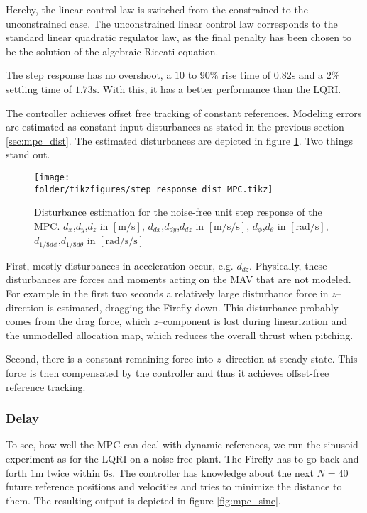 Hereby, the linear control law is switched from the constrained to the unconstrained case. The unconstrained linear control law corresponds to the standard linear quadratic regulator law, as the final penalty has been chosen to be the solution of the algebraic Riccati equation.

The step response has no overshoot, a $10$ to $90\si{\percent}$ rise time of $0.82 \si{\second}$ and a $2\si{\percent}$ settling time of $1.73 \si{\second}$. With this, it has a better performance than the LQRI.

The controller achieves offset free tracking of constant references. Modeling errors are estimated as constant input disturbances as stated in the previous section \ref{sec:mpc_dist}. The estimated disturbances are depicted in figure \ref{fig:mpc_step_dist}. Two things stand out.

\begin{figure}
\centering
\texttt{[image: \\folder/tikzfigures/step\_response\_dist\_MPC.tikz]}
\caption{Disturbance estimation for the noise-free unit step response of the MPC. $d_x$,$d_y$,$d_z$ in $[\si{\metre\per\second}]$, $d_{dx}$,$d_{dy}$,$d_{dz}$ in $[\si{\metre\per\second\per\second}]$, $d_\phi$,$d_\theta$ in $[\si{\radian\per\second}]$, $d_{1/8d\phi}$,$d_{1/8d\theta}$ in $[\si{\radian\per\second\per\second}]$}
\label{fig:mpc_step_dist}
\end{figure}

First, mostly disturbances in acceleration occur, e.g. $d_{dz}$. Physically, these disturbances are forces and moments acting on the MAV that are not modeled. For example in the first two seconds a relatively large disturbance force in $z$--direction is estimated, dragging the Firefly down. This disturbance probably comes from the drag force, which $z$--component is lost during linearization and the unmodelled allocation map, which reduces the overall thrust when pitching.

Second, there is a constant remaining force into $z$--direction at steady-state. This force is then compensated by the controller and thus it achieves offset-free reference tracking.

\subsubsection{Delay}
To see, how well the MPC can deal with dynamic references, we run the sinusoid experiment as for the LQRI on a noise-free plant. The Firefly has to go back and forth $1\si{\metre}$ twice within $6 \si{\second}$. The controller has knowledge about the next $N=40$ future reference positions and velocities and tries to minimize the distance to them. The resulting output is depicted in figure \ref{fig:mpc_sine}.

